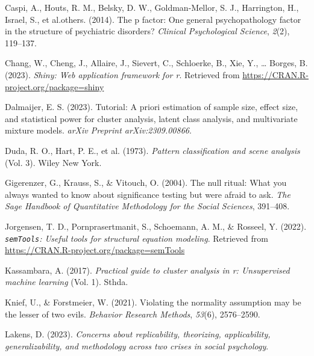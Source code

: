 \documentclass[
  man,floatsintext]{apa6}
\newlength{\cslhangindent}
\newlength{\cslentryspacingunit} %
\newenvironment{CSLReferences}[2] %
 {%
  \setlength{\parindent}{0pt}
  \ifodd #1
  \let\oldpar\par
  \def\par{\hangindent=\cslhangindent\oldpar}
  \fi
  \setlength{\parskip}{#2\cslentryspacingunit}
 }%
 {}
\begin{document}
\hypertarget{refs}{}
\begin{CSLReferences}{1}{0}
\leavevmode{}%
Caspi, A., Houts, R. M., Belsky, D. W., Goldman-Mellor, S. J., Harrington, H., Israel, S., et al.others. (2014). The p factor: One general psychopathology factor in the structure of psychiatric disorders? \emph{Clinical Psychological Science}, \emph{2}(2), 119--137.

\leavevmode{}%
Chang, W., Cheng, J., Allaire, J., Sievert, C., Schloerke, B., Xie, Y., \ldots{} Borges, B. (2023). \emph{Shiny: Web application framework for r}. Retrieved from \url{https://CRAN.R-project.org/package=shiny}

\leavevmode{}%
Dalmaijer, E. S. (2023). Tutorial: A priori estimation of sample size, effect size, and statistical power for cluster analysis, latent class analysis, and multivariate mixture models. \emph{arXiv Preprint arXiv:2309.00866}.

\leavevmode{}%
Duda, R. O., Hart, P. E., et al. (1973). \emph{Pattern classification and scene analysis} (Vol. 3). Wiley New York.

\leavevmode{}%
Gigerenzer, G., Krauss, S., \& Vitouch, O. (2004). The null ritual: What you always wanted to know about significance testing but were afraid to ask. \emph{The Sage Handbook of Quantitative Methodology for the Social Sciences}, 391--408.

\leavevmode{}%
Jorgensen, T. D., Pornprasertmanit, S., Schoemann, A. M., \& Rosseel, Y. (2022). \emph{\texttt{semTools}: {U}seful tools for structural equation modeling}. Retrieved from \url{https://CRAN.R-project.org/package=semTools}

\leavevmode{}%
Kassambara, A. (2017). \emph{Practical guide to cluster analysis in r: Unsupervised machine learning} (Vol. 1). Sthda.

\leavevmode{}%
Knief, U., \& Forstmeier, W. (2021). Violating the normality assumption may be the lesser of two evils. \emph{Behavior Research Methods}, \emph{53}(6), 2576--2590.

\leavevmode{}%
Lakens, D. (2023). \emph{Concerns about replicability, theorizing, applicability, generalizability, and methodology across two crises in social psychology}.


\end{CSLReferences}
\end{document}
